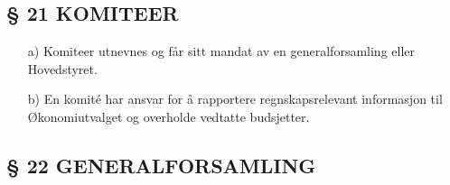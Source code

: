 \subsection*{§ 21 KOMITEER}

\begin{itemize}
\item[a)] Komiteer utnevnes og får sitt mandat av en generalforsamling eller
Hovedstyret.

\item[b)] En komité har ansvar for å rapportere regnskapsrelevant informasjon til Økonomiutvalget og overholde vedtatte budsjetter.
\end{itemize}


\subsection*{§ 22 GENERALFORSAMLING}

